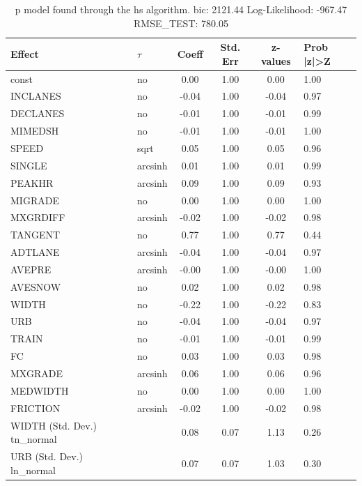 \begin{table}
	\caption{p model found through the hs algorithm. bic: 2121.44 Log-Likelihood: -967.47 RMSE_TEST: 780.05}
	\begin{center}
		\begin{tabular}{|l|l|c|c|c|l|}
			\hline
			Effect & $\tau$ & Coeff & Std. Err & z-values & Prob |z|>Z \\
			\hline
			const & no & 0.00 & 1.00 & 0.00 & 1.00 \\
			\hline
			INCLANES & no & -0.04 & 1.00 & -0.04 & 0.97 \\
			\hline
			DECLANES & no & -0.01 & 1.00 & -0.01 & 0.99 \\
			\hline
			MIMEDSH & no & -0.01 & 1.00 & -0.01 & 1.00 \\
			\hline
			SPEED & sqrt & 0.05 & 1.00 & 0.05 & 0.96 \\
			\hline
			SINGLE & arcsinh & 0.01 & 1.00 & 0.01 & 0.99 \\
			\hline
			PEAKHR & arcsinh & 0.09 & 1.00 & 0.09 & 0.93 \\
			\hline
			MIGRADE & no & 0.00 & 1.00 & 0.00 & 1.00 \\
			\hline
			MXGRDIFF & arcsinh & -0.02 & 1.00 & -0.02 & 0.98 \\
			\hline
			TANGENT & no & 0.77 & 1.00 & 0.77 & 0.44 \\
			\hline
			ADTLANE & arcsinh & -0.04 & 1.00 & -0.04 & 0.97 \\
			\hline
			AVEPRE & arcsinh & -0.00 & 1.00 & -0.00 & 1.00 \\
			\hline
			AVESNOW & no & 0.02 & 1.00 & 0.02 & 0.98 \\
			\hline
			WIDTH & no & -0.22 & 1.00 & -0.22 & 0.83 \\
			\hline
			URB & no & -0.04 & 1.00 & -0.04 & 0.97 \\
			\hline
			TRAIN & no & -0.01 & 1.00 & -0.01 & 0.99 \\
			\hline
			FC & no & 0.03 & 1.00 & 0.03 & 0.98 \\
			\hline
			MXGRADE & arcsinh & 0.06 & 1.00 & 0.06 & 0.96 \\
			\hline
			MEDWIDTH & no & 0.00 & 1.00 & 0.00 & 1.00 \\
			\hline
			FRICTION & arcsinh & -0.02 & 1.00 & -0.02 & 0.98 \\
			\hline
			WIDTH (Std. Dev.) tn_normal &  & 0.08 & 0.07 & 1.13 & 0.26 \\
			\hline
			URB (Std. Dev.) ln_normal &  & 0.07 & 0.07 & 1.03 & 0.30 \\

\end{tabular}
\end{center}
\end{table}

